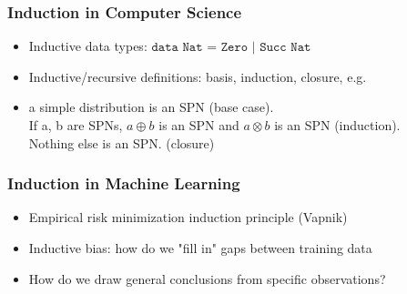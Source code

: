 \documentclass{beamer}
\begin{document}
    \begin{frame}
        \frametitle{Induction in Computer Science}
        \begin{itemize}
            \item Inductive data types: $\texttt{data Nat = Zero | Succ Nat}$
            \item Inductive/recursive definitions: basis, induction, closure, e.g.
            \item a simple distribution is an SPN (base case). \\If a, b are SPNs, $a \oplus b$ is an SPN and $a \otimes b$ is an SPN (induction).\\ Nothing else is an SPN. (closure)
        \end{itemize}
    \end{frame}

    \begin{frame}
        \frametitle{Induction in Machine Learning}
        \begin{itemize}
            \item Empirical risk minimization induction principle (Vapnik)
            \item Inductive bias: how do we "fill in" gaps between training data
            \item How do we draw general conclusions from specific observations?
        \end{itemize}
    \end{frame}
\end{document}
